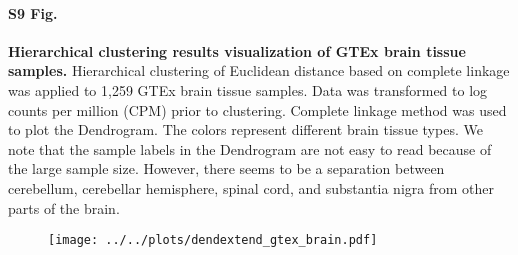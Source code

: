 \documentclass[10pt,letterpaper]{article}
\begin{document}
\paragraph*{S9 Fig.}

\label{figS9}
{\bf Hierarchical clustering results visualization of GTEx brain tissue samples.} Hierarchical clustering of Euclidean distance based on complete linkage was applied to 1,259 GTEx brain tissue samples. Data was transformed to log counts per million (CPM) prior to clustering. Complete linkage method was used to plot the Dendrogram. The colors represent different brain tissue types. We note that the sample labels in the Dendrogram are not easy to read because of the large sample size. However, there seems to be a separation between cerebellum, cerebellar hemisphere, spinal cord, and substantia nigra from other parts of the brain.

\begin{figure}[ht]
\centering
\texttt{[image: ../../plots/dendextend\_gtex\_brain.pdf]}
\end{figure}
\end{document}

